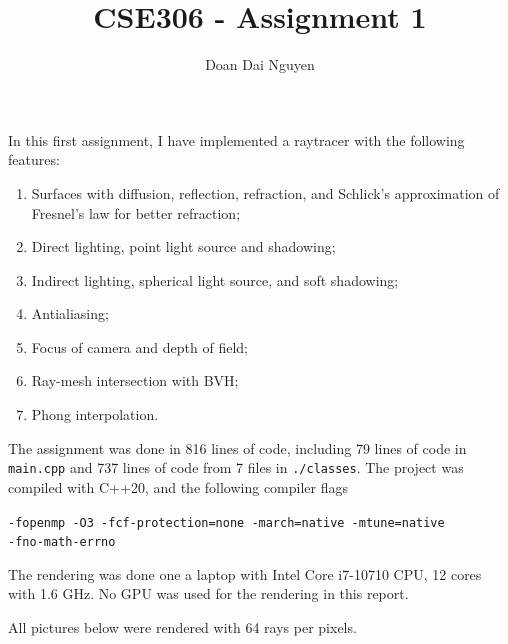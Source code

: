 \documentclass{amsart}
\title{CSE306 - Assignment 1}
\author{Doan Dai Nguyen}
\begin{document}
\maketitle

In this first assignment, I have implemented a raytracer with the following features:
\begin{enumerate}
    \item Surfaces with diffusion, reflection, refraction, and Schlick's approximation of Fresnel's law for better refraction;
    \item Direct lighting, point light source and shadowing;
    \item Indirect lighting, spherical light source, and soft shadowing;
    \item Antialiasing;
    \item Focus of camera and depth of field;
    \item Ray-mesh intersection with BVH;
    \item Phong interpolation.
\end{enumerate}

The assignment was done in 816 lines of code, including 79 lines of code in \texttt{main.cpp} and 737 lines of code from 7 files in \texttt{./classes}. The project was compiled with C++20, and the following compiler flags

\texttt{-fopenmp -O3 -fcf-protection=none -march=native -mtune=native \\-fno-math-errno}

The rendering was done one a laptop with Intel Core i7-10710 CPU, 12 cores with 1.6 GHz. No GPU was used for the rendering in this report.

All pictures below were rendered with 64 rays per pixels.
\end{document}
